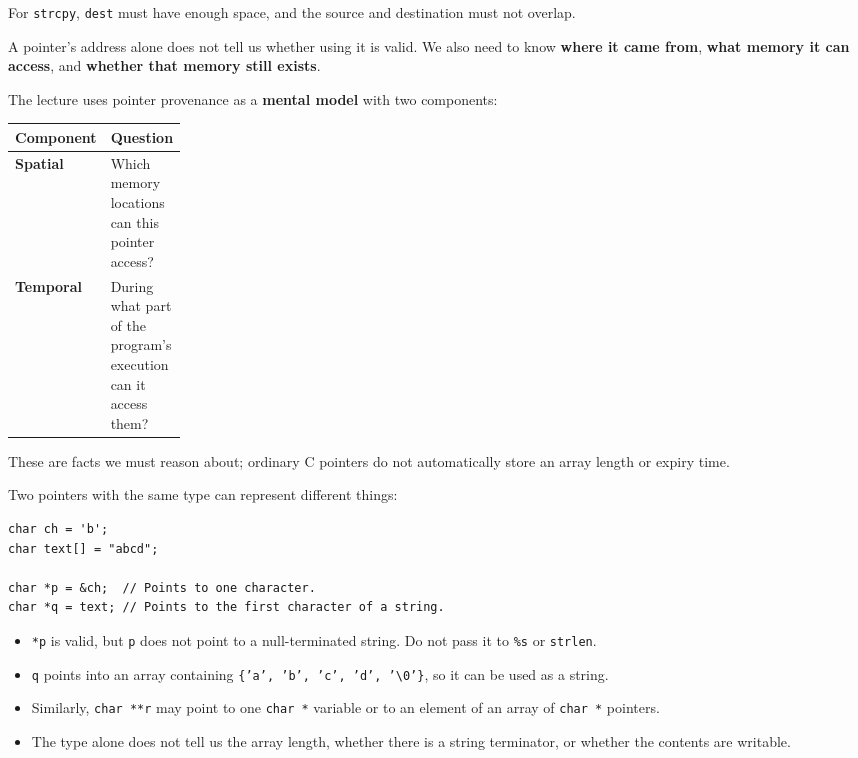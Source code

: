 \documentclass[11pt,a4paper]{article}
\begin{document}
For \texttt{strcpy}, \texttt{dest} must have enough space, and
the source and destination must not overlap.


A pointer's address alone does not tell us whether using it is
valid. We also need to know \textbf{where it came from},
\textbf{what memory it can access}, and
\textbf{whether that memory still exists}.

The lecture uses pointer provenance as a \textbf{mental model}
with two components:

\begin{longtable}{@{}
    >{\raggedright\arraybackslash}p{0.20\linewidth}
    >{\raggedright\arraybackslash}p{}@{}}
\toprule
\textbf{Component} & \textbf{Question} \\
\midrule
\endhead
\bottomrule
\endlastfoot
\textbf{Spatial}
    & Which memory locations can this pointer access? \\
\textbf{Temporal}
    & During what part of the program's execution can it
      access them? \\
\end{longtable}

These are facts we must reason about; ordinary C pointers do not
automatically store an array length or expiry time.


Two pointers with the same type can represent different things:

\begin{lstlisting}[style=cscode]
char ch = 'b';
char text[] = "abcd";

char *p = &ch;  // Points to one character.
char *q = text; // Points to the first character of a string.
\end{lstlisting}

\begin{itemize}
    \item \texttt{*p} is valid, but \texttt{p} does not point to a
          null-terminated string. Do not pass it to
          \texttt{\%s} or \texttt{strlen}.
    \item \texttt{q} points into an array containing
          \texttt{\{'a', 'b', 'c', 'd', '\textbackslash0'\}},
          so it can be used as a string.
    \item Similarly, \texttt{char **r} may point to one
          \texttt{char *} variable or to an element of an array
          of \texttt{char *} pointers.
    \item The type alone does not tell us the array length,
          whether there is a string terminator, or whether the
          contents are writable.
\end{itemize}
\end{document}
